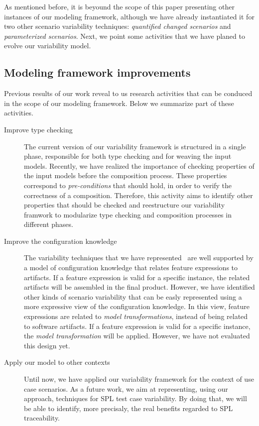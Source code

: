 \documentclass[times, 11pt,twocolumn]{article}
\begin{document}
As mentioned before, it is beyound the scope of this paper presenting other
instances of our modeling framework, although we have already instantiated it
for two other scenario variability techniques: \emph{quantified changed
scenarios} and \emph{parameterized scenarios}. Next, we point some activities
that we have planed to evolve our variability model.

\subsection{Modeling framework improvements}

Previous results of our work reveal to us research activities that can
be conduced in the scope of our modeling framework. Below we summarize part of
these activities.

\begin{description}
  \item [Improve type checking] The current version of our variability
  framework is structured in a single phase, responsible for both type checking and
  for weaving the input models. Recently, we have realized the importance of
  checking properties of the input models before the composition process.
  These properties correspond to \emph{pre-conditions} that should hold, in
  order to verify the correctness of a composition. Therefore, this activity
  aims to identify other properties that should be checked and reestructure our
  variability framwork to modularize type checking and composition processes in
  different phases.
  \item [Improve the configuration knowledge] The variability techniques that
  we have represented~\cite{} are well supported by a model of
  configuration knowledge that relates feature
  expressions to artifacts. If a feature expression is valid for a
  specific instance, the related artifacts will be assembled in the final
  product. However, we have identified other kinds of scenario variability that
  can be easly represented using a more expressive view of the configuration
  knowledge. In this view, feature expressions are related to \emph{model
  transformations}, instead of being related to software artifacts. If a
  feature expression is valid for a specific instance, the \emph{model
  transformation} will be applied. However, we have not evaluated this design
  yet.
  \item [Apply our model to other contexts] Until now, we have applied our
  variability framework for the context of use case scenarios. As a future
  work, we aim at representing, using our approach, techniques for SPL test
  case variability. By doing that, we will be able to identify, more
  precisaly, the real benefits regarded to SPL traceability.
\end{description}
 
\end{document}
